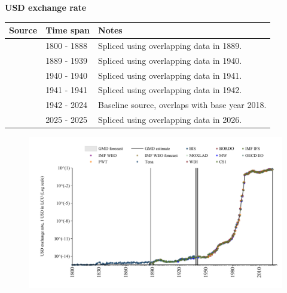 \documentclass[12pt,a4paper,landscape]{article}
\begin{document}
\begin{adjustbox}{max totalsize={\paperwidth}{\paperheight},center}
\begin{minipage}[t][\textheight][t]{\textwidth}
\vspace*{0.5cm}
{}
\begin{center}
{\Large\bfseries USD exchange rate}
\end{center}
\vspace{0.5cm}
\begin{table}[H]
\centering
\small
\begin{tabular}{|l|l|l|}
\hline
\textbf{Source} & \textbf{Time span} & \textbf{Notes} \\
\hline
\rowcolor{white}\cite{Tena}& 1800 - 1888 &Spliced using overlapping data in 1889. \\
\rowcolor{lightgray}\cite{CS1_BRA}& 1889 - 1939 &Spliced using overlapping data in 1940. \\
\rowcolor{white}\cite{BORDO}& 1940 - 1940 &Spliced using overlapping data in 1941. \\
\rowcolor{lightgray}\cite{CS1_BRA}& 1941 - 1941 &Spliced using overlapping data in 1942. \\
\rowcolor{white}\cite{BIS}& 1942 - 2024 &Baseline source, overlaps with base year 2018. \\
\rowcolor{lightgray}\cite{OECD_EO}& 2025 - 2025 &Spliced using overlapping data in 2026. \\
\hline
\end{tabular}
\end{table}
\begin{figure}[H]
\centering
\includegraphics[width=\textwidth,height=0.6\textheight,keepaspectratio]{graphs/BRA_USDfx.pdf}
\end{figure}
\end{minipage}
\end{adjustbox}
\end{document}
